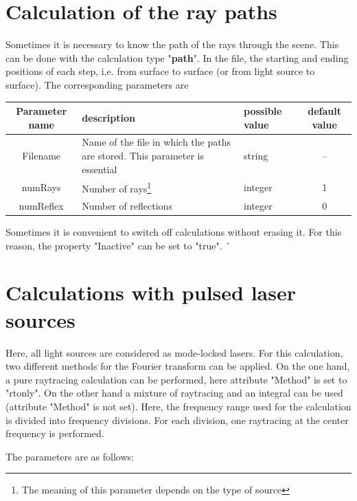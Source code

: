 \documentclass[a4paper,html,11pt,openany]{book}
\begin{document}
 \section{Calculation of the ray paths}
 Sometimes it is necessary to know the path of the rays through the scene. This can be done with the calculation type "{\bf path}". In the file, the starting and ending positions of each step, i.e. from surface to surface (or from light source to surface).
 The corresponding parameters are
 
 \vspace{1em}
 \begin{table}[h!]
\fontsize{10pt}{10pt}\selectfont
 \begin{tabular}{c|m{3cm}|m{3cm}|c}
  Parameter name & description  & possible value & default value \\
 \hline
 Filename & Name of the file in which the paths are stored. This parameter is essential & string & -- \\
 \hline 
 numRays & Number of rays\footnote{The meaning of this parameter depends on the type of source} & integer & 1 \\
 \hline 
 numReflex & Number of reflections & integer & 0 \\
 \hline 
 \end{tabular}
   \end{table}
   Sometimes it is convenient to switch off calculations without erasing it. For this reason, the property "Inactive" can be set to "true". ´ 
 \section{Calculations with pulsed laser sources}
 Here, all light sources are considered as mode-locked lasers.  For this calculation, two different methods for the Fourier transform can be applied. On the one hand, a pure raytracing calculation can be performed, here attribute "Method" is set to "rtonly". On the other hand a mixture of raytracing and an integral can be used (attribute "Method" is not set). Here, the frequency range used for the calculation is divided into frequency divisions. For each division, one raytracing at the center frequency is performed. 
 
The parameters are as follows:
 
\end{document}
